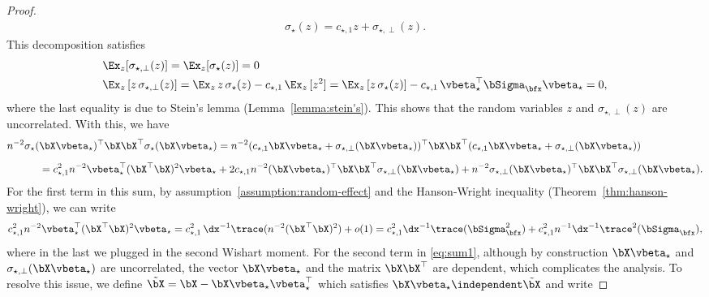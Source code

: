 \begin{proof}
    \begin{align}
        \label{eq:expansions}
        \sigma_\star(z) = c_{\star,1} z + \sigma_{\star, \perp}(z).
    \end{align}
    This decomposition satisfies
    \begin{align*}
        &\Ex_z [\sigma_{\star, \perp}(z)] = \Ex_z  [\sigma_\star(z)] = 0\\
        &\Ex_z\,[ z\, \sigma_{\star, \perp} (z) ] = \Ex_z\, z\,\sigma_\star(z) - c_{\star,1}\,\Ex_z \, [z^2] =  \Ex_z\, [z\,\sigma_\star(z)] - c_{\star,1}\, \vbeta_\star^\top \bSigma_\bfx \vbeta_\star = 0,
    \end{align*}
    where the last equality is due to Stein's lemma (Lemma~\ref{lemma:stein's}). This shows that the random variables $z$ and $\sigma_{\star, \perp}(z)$ are uncorrelated. With this, we have
    \begin{align}
        \label{eq:sum1}
        n^{-2} \sigma_\star(&\bX\vbeta_\star)^\top\bX \bX^\top\sigma_\star(\bX\vbeta_\star) = n^{-2} (c_{\star,1} \bX\vbeta_\star + \sigma_{\star,\perp}(\bX\vbeta_\star))^\top\bX \bX^\top(c_{\star,1} \bX\vbeta_\star + \sigma_{\star,\perp}(\bX\vbeta_\star))\nonumber\\[0.2cm]
        &=  c_{\star,1}^2 n^{-2} \vbeta_\star^\top (\bX^\top \bX)^2 \vbeta_\star + 2  c_{\star,1} n^{-2} (\bX\vbeta_\star)^\top \bX\bX^\top \sigma_{\star,\perp}(\bX\vbeta_\star) +  n^{-2} \sigma_{\star,\perp}(\bX\vbeta_\star)^\top \bX\bX^\top \sigma_{\star,\perp}(\bX\vbeta_\star).
    \end{align}
    For the first term in this sum, by assumption~\ref{assumption:random-effect} and the Hanson-Wright inequality (Theorem~\ref{thm:hanson-wright}), we can write 
    \begin{align*}
        c_{\star,1}^2  n^{-2} \vbeta_\star^\top (\bX^\top \bX)^2 \vbeta_\star = c_{\star,1}^2\,\dx^{-1} \trace(n^{-2}(\bX^\top\bX)^2) + o(1) = c_{\star,1}^2 \dx^{-1} \trace(\bSigma_\bfx^2) + c_{\star,1}^2n^{-1} \dx^{-1} \trace^2(\bSigma_\bfx),
    \end{align*}
    where in the last we plugged in the second Wishart moment. For the second term in  \eqref{eq:sum1}, although by construction $\bX\vbeta_\star$ and $\sigma_{\star, \perp}(\bX\vbeta_\star)$ are uncorrelated, the vector $\bX\vbeta_\star$ and the matrix $\bX\bX^\top$ are dependent, which complicates the analysis. To resolve this issue, we define $\tilde \bX = \bX - \bX \vbeta_\star\vbeta_\star^\top$ which satisfies $\bX\vbeta_\star \independent \tilde\bX$ and write

\end{proof}
